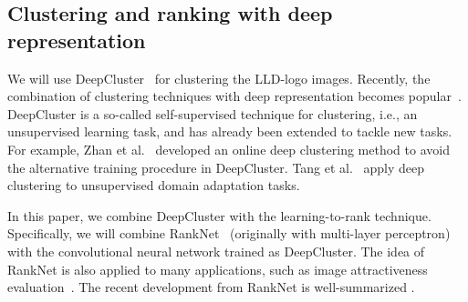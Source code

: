 \documentclass[runningheads]{llncs}
\begin{document}
\subsection{Clustering and ranking with deep representation}
We will use DeepCluster~\cite{Caron2018deepcluster} for clustering the LLD-logo images. Recently, the combination of clustering techniques with deep representation becomes popular~\cite{Aljalbout2018,Min2018}. DeepCluster is a so-called self-supervised technique for clustering, i.e., an unsupervised learning task, and has already been extended to tackle new tasks. For example, Zhan et al.~\cite{Zhan_2020_CVPR}
developed an online deep clustering method to avoid the alternative training procedure in DeepCluster. Tang et al.~\cite{Tang2020} apply deep clustering to unsupervised domain adaptation tasks.\par
%
In this paper, we combine DeepCluster with the learning-to-rank technique. Specifically, we will combine RankNet~\cite{Burges2005} (originally with multi-layer perceptron) with the convolutional neural network trained as DeepCluster. The idea of RankNet is also applied to many applications, such as image attractiveness evaluation~\cite{Ma2019}.
The recent development from RankNet is well-summarized \cite{Guo2020}.
%
\end{document}
